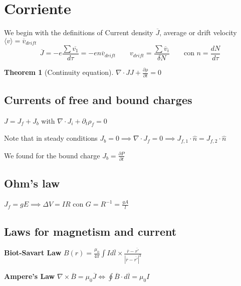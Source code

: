 \documentclass[leqno]{article}
\newtheorem*{theorem}{Theorem}
\begin{document}
\section{Corriente}
We begin with the definitions of Current density $\overline{J}$, average or drift velocity $\langle v \rangle = \overline{v}_{drift} $
\[
\overline{J} = -e\frac{\sum\overline{v_1}}{d\tau} = -en\overline{v}_{drift} \qquad v_{drift} = \frac{\sum \overline{v}_i }{\delta N} \qquad  \text{con } n = \frac{dN}{d\tau }  
\] 

\begin{theorem}[Continuity equation] $\displaystyle \nabla\cdot JJ+ \frac{\partial \rho }{\partial t} = 0$
\end{theorem}

\subsection{Currents of free and bound charges}
$J = J_f + J_b$ with  $\nabla\cdot J_i + \partial_t \rho _f = 0$

Note that in steady conditions $J_b = 0 \implies \nabla\cdot J_f = 0 \implies J_{f, 1}\cdot \hat{n} = J_{f, 2}\cdot \hat{n}$

We found for the bound charge $\boxed{J_b = \frac{\partial P}{\partial t}}$

 \subsection{Ohm's law}
 $J_f = gE \implies \Delta V = IR$ con $G = R^{-1} = \frac{gA}{l}$


\subsection{Laws for magnetism and current}
\textbf{Biot-Savart Law} $\displaystyle \boxed{B(r) = \frac{\mu_0}{4\pi}\int Id\overline{l}\times \frac{\overline{r}-\overline{r'}}{|\overline{r}-\overline{r'}|^3}}$

\textbf{Ampere's Law} $\displaystyle \boxed{\nabla\times \overline{B} = \mu_0 \overline{J} \iff \oint \overline{B}\cdot d\overline{l} = \mu_0 I}$
\end{document}
